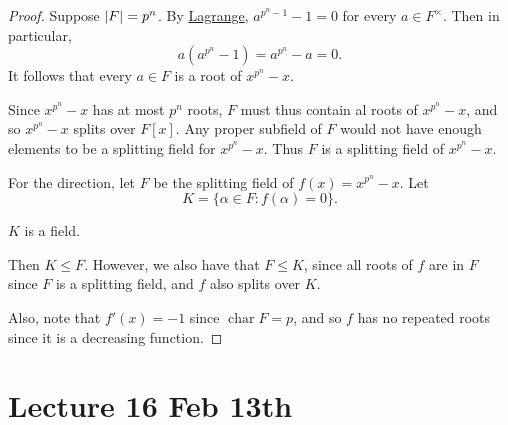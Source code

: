 \documentclass[notoc,notitlepage]{tufte-book}
\DeclareMathOperator{\Char}{char}
\begin{document}
\begin{proof}
  Suppose $\left|F\right| = p^n$. By \hyperref[thm:lagrange_s_theorem]{Lagrange}, $a^{p^n - 1} - 1 = 0$ for every $a \in F^\times$. Then in particular,
  \begin{equation*}
    a(a^{p^n} - 1) = a^{p^n} - a = 0.
  \end{equation*}
  It follows that every $a \in F$ is a root of $x^{p^n} - x$.

  Since $x^{p^n} - x$ has at most $p^n$ roots, $F$ must thus contain al roots of $x^{p^n}
  - x$, and so $x^{p^n} - x$ splits over $F[x]$. Any proper subfield of $F$ would not have
  enough elements to be a splitting field for $x^{p^n} - x$. Thus $F$ is a splitting field
  of $x^{p^n} - x$.

  For the \hlbnoted{$\impliedby$} direction, let $F$ be the splitting field of $f(x) =
  x^{p^n} - x$. Let
  \begin{equation*}
    K = \{ \alpha \in F : f(\alpha) = 0 \}.
  \end{equation*}
  \begin{ex}
    $K$ is a field.
  \end{ex}

  Then $K \leq F$. However, we also have that $F \leq K$, since all roots of $f$ are in
  $F$ since $F$ is a splitting field, and $f$ also splits over $K$.

  Also, note that $f'(x) = -1$ since $\Char F = p$, and so $f$ has no repeated roots since
  it is a decreasing function.
\end{proof}



\chapter{Lecture 16 Feb 13th}%
\label{chp:lecture_16_feb_13th}
\end{document}
